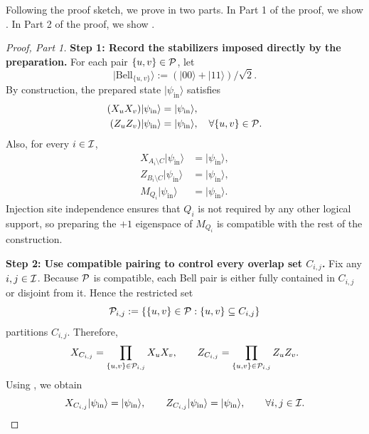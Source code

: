 Following the proof sketch, we prove in two parts.
In Part 1 of the proof, we show .
In Part 2 of the proof, we show .

\begin{proof}[Proof, Part 1]
\textbf{Step 1: Record the stabilizers imposed directly by the preparation.}
For each pair $\{u,v\}\in\mathcal{P}$, let
\[
|\mathrm{Bell}_{\{u,v\}}\rangle := (|00\rangle+|11\rangle)/\sqrt2.
\]
By construction, the prepared state $|\psi_{\mathrm{in}}\rangle$ satisfies
\begin{equation}
    \begin{aligned}
(X_uX_v)|\psi_{\mathrm{in}}\rangle &= |\psi_{\mathrm{in}}\rangle, \\
(Z_uZ_v)|\psi_{\mathrm{in}}\rangle &= |\psi_{\mathrm{in}}\rangle, \quad
\forall \{u,v\}\in\mathcal{P}.
\end{aligned}
\label{eq:bell-pair-stabs-app}
\end{equation}
Also, for every $i\in\mathcal{I}$,
\begin{equation}
\begin{aligned}
X_{A_i\setminus C}|\psi_{\mathrm{in}}\rangle &= |\psi_{\mathrm{in}}\rangle, \\
Z_{B_i\setminus C}|\psi_{\mathrm{in}}\rangle &= |\psi_{\mathrm{in}}\rangle, \\
M_{Q_i}|\psi_{\mathrm{in}}\rangle &= |\psi_{\mathrm{in}}\rangle.
\end{aligned}
\label{eq:direct-prep-stabs-app}
\end{equation}
Injection site independence ensures that $Q_i$ is not required by any other
logical support, so preparing the $+1$ eigenspace of $M_{Q_i}$ is compatible
with the rest of the construction.

\medskip
\noindent
\textbf{Step 2: Use compatible pairing to control every overlap set $C_{i,j}$.}
Fix any $i,j\in\mathcal{I}$.
Because $\mathcal{P}$ is compatible, each Bell pair is either fully contained in
$C_{i,j}$ or disjoint from it.
Hence the restricted set
\[
\mathcal{P}_{i,j}:=\{\{u,v\}\in\mathcal{P}:\{u,v\}\subseteq C_{i,j}\}
\]
partitions $C_{i,j}$.
Therefore,
\[
X_{C_{i,j}}=\prod_{\{u,v\}\in\mathcal{P}_{i,j}} X_uX_v,
\qquad
Z_{C_{i,j}}=\prod_{\{u,v\}\in\mathcal{P}_{i,j}} Z_uZ_v.
\]
Using , we obtain
\begin{equation}
X_{C_{i,j}}|\psi_{\mathrm{in}}\rangle = |\psi_{\mathrm{in}}\rangle,
\qquad
Z_{C_{i,j}}|\psi_{\mathrm{in}}\rangle = |\psi_{\mathrm{in}}\rangle,
\qquad \forall i,j\in\mathcal{I}.
\label{eq:cij-stabs-app}
\end{equation}


\end{proof}
